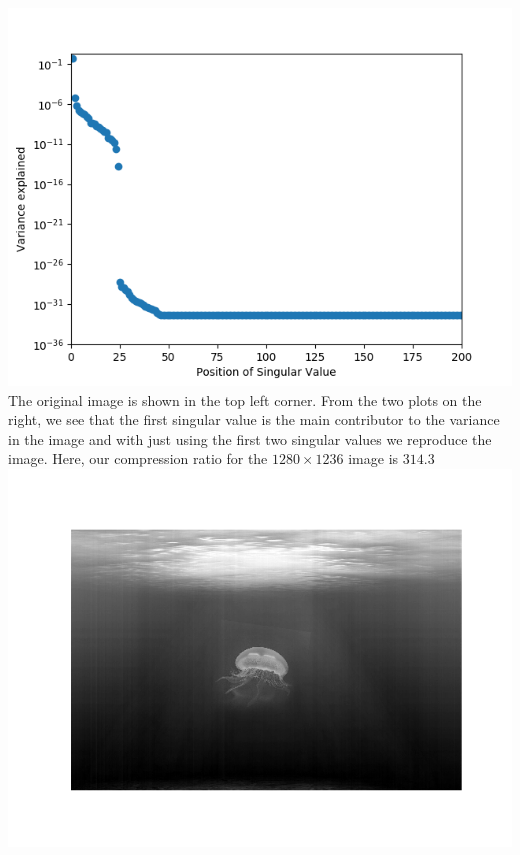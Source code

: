 \documentclass[11pt]{article}
\begin{document}
\begin{enumerate}
\includegraphics[scale=.55]{checker_var.png}\\
The original image is shown in the top left corner. From the two plots on the right, we see that the first singular value is the main contributor to the variance in the image and with just using the first two singular values we reproduce the image. Here, our compression ratio for the $1280 \times 1236$ image is $314.3$\\
\includegraphics[scale=.55]{jelly_g.png}

\end{enumerate}
\end{document}
